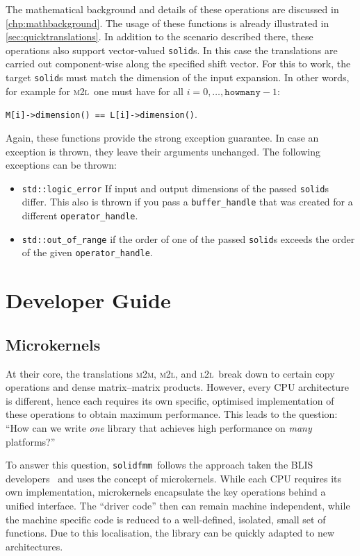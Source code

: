 \documentclass{scrbook}
\newcommand{\solidfmm}{\texttt{solidfmm}}
\newcommand{\MtoM}{\textsc{m2m}}
\newcommand{\MtoL}{\textsc{m2l}}
\newcommand{\LtoL}{\textsc{l2l}}
\begin{document}
The mathematical background and details of these operations are discussed in
\cref{chp:mathbackground}. The usage of these functions is already illustrated
in \cref{sec:quicktranslations}. In addition to the scenario described there,
these operations also support vector-valued \lstinline|solid|s. In this case
the translations are carried out component-wise along the specified shift
vector. For this to work, the target \lstinline|solid|s must match the
dimension of the input expansion. In other words, for example for 
\MtoL\ one must have for all $i=0,\dotsc,\mathtt{howmany}-1$:
\begin{center}
\lstinline|M[i]->dimension() == L[i]->dimension()|.
\end{center}

Again, these functions provide the strong exception guarantee. In case an
exception is thrown, they leave their arguments unchanged. The following
exceptions can be thrown:
\begin{itemize}
\item \lstinline|std::logic_error| If input and output dimensions of the passed
\lstinline|solid|s differ. This also is thrown if you pass a
\lstinline|buffer_handle| that was created for a different
\lstinline|operator_handle|.
\item \lstinline|std::out_of_range| if the order of one of the passed
\lstinline|solid|s exceeds the order of the given \lstinline|operator_handle|.
\end{itemize}

\part{Developer Guide}\label{part:developer}

\chapter{Microkernels}
At their core, the translations \MtoM, \MtoL, and \LtoL\ break down to certain
copy operations and dense matrix--matrix products. However, every CPU
architecture is different, hence each requires its own specific, optimised
implementation of these operations to obtain maximum performance. This leads
to the question: \enquote{How can we write \emph{one} library that achieves
high performance on \emph{many} platforms?}

To answer this question, \solidfmm\ follows the approach taken the BLIS
developers~\autocite{blispaper,blisproject} and uses the concept of
microkernels. While each CPU requires its own implementation, microkernels
encapsulate the key operations behind a unified interface. The
\enquote{driver code} then can remain machine independent, while the
machine specific code is reduced to a well-defined, isolated, small
set of functions. Due to this localisation, the library can be quickly
adapted to new architectures.
\end{document}
